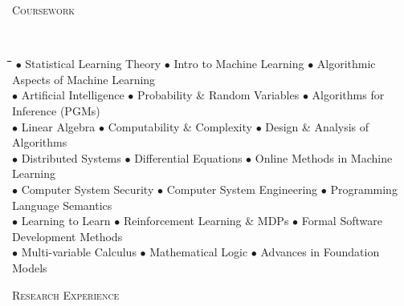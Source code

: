 \documentclass{article}
\newenvironment{changemargin}[2]{%
  \begin{list}{}{%
    \setlength{\topsep}{0pt}%
    \setlength{\leftmargin}{#1}%
    \setlength{\rightmargin}{#2}%
    \setlength{\listparindent}{\parindent}%
    \setlength{\itemindent}{\parindent}%
    \setlength{\parsep}{\parskip}%
  }%
  \item[]}{\end{list}
}
\newcommand{\lineover}{
	\begin{changemargin}{-0.05in}{-0.05in}
		\vspace*{-8pt}
		\hrulefill \\
		\vspace*{-2pt}
	\end{changemargin}
}
\newcommand{\header}[1]{
	\begin{changemargin}{-0.5in}{-0.5in}
		\scshape{#1}\\
  	\lineover
	\end{changemargin}
}
\newenvironment{body} {
	\vspace*{-16pt}
	\begin{changemargin}{-0.25in}{-0.5in}
  }	
	{\end{changemargin}
}
\newcommand{\bul}{$\bullet$ \hspace*{0em}}
\begin{document}
\header{Coursework}

\begin{body}
	\vspace{14pt}
	\begin{tabbing}
	\hspace*{1cm}\=\hspace*{1cm}\=\hspace*{1cm}\=\hspace*{1cm}\=\hspace*{1cm}\=\hspace*{1cm}\=\hspace*{1cm}\=\hspace*{1cm}\=\hspace*{1cm}\=\hspace*{1cm}\=\hspace*{1cm}\=\hspace*{1cm}\=\hspace*{1cm} \kill
	\bul Statistical Learning Theory \> \> \> \> \> \bul Intro to Machine Learning \> \> \> \> \> \> \bul Algorithmic Aspects of Machine Learning  \\
	\bul Artificial Intelligence \> \> \> \> \> \bul Probability \& Random Variables \> \> \> \> \> \> \bul Algorithms for Inference (PGMs) \\
	\bul Linear Algebra \> \> \> \> \> \bul Computability \& Complexity \> \> \> \> \> \> \bul Design \& Analysis of Algorithms \\
	\bul Distributed Systems \> \> \> \> \> \bul Differential Equations \> \> \> \> \> \> \bul Online Methods in Machine Learning \\
    \bul Computer System Security \> \> \> \> \> \bul Computer System Engineering \> \> \> \> \> \> \bul Programming Language Semantics  \\
    \bul Learning to Learn \> \> \> \> \> \bul Reinforcement Learning \& MDPs \> \> \> \> \> \>  \bul Formal Software Development Methods \\
    \bul Multi-variable Calculus \> \> \> \> \> \bul Mathematical Logic \> \> \> \> \> \>  \bul Advances in Foundation Models \\
	\end{tabbing}
	\end{body}
\smallskip

\header{Research Experience}
\end{document}
